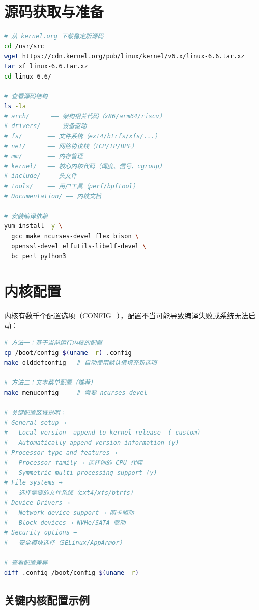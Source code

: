 \documentclass[12pt,UTF8]{ctexbook}
\begin{document}
\section{源码获取与准备}
\label{sec:kernel-source}

\begin{lstlisting}[language=bash]
# 从 kernel.org 下载稳定版源码
cd /usr/src
wget https://cdn.kernel.org/pub/linux/kernel/v6.x/linux-6.6.tar.xz
tar xf linux-6.6.tar.xz
cd linux-6.6/

# 查看源码结构
ls -la
# arch/      —— 架构相关代码（x86/arm64/riscv）
# drivers/   —— 设备驱动
# fs/       —— 文件系统（ext4/btrfs/xfs/...）
# net/      —— 网络协议栈（TCP/IP/BPF）
# mm/       —— 内存管理
# kernel/   —— 核心内核代码（调度、信号、cgroup）
# include/  —— 头文件
# tools/    —— 用户工具（perf/bpftool）
# Documentation/ —— 内核文档

# 安装编译依赖
yum install -y \
  gcc make ncurses-devel flex bison \
  openssl-devel elfutils-libelf-devel \
  bc perl python3
\end{lstlisting}

\section{内核配置}
\label{sec:kernel-config}

内核有数千个配置选项（CONFIG\_\*），配置不当可能导致编译失败或系统无法启动：

\begin{lstlisting}[language=bash]
# 方法一：基于当前运行内核的配置
cp /boot/config-$(uname -r) .config
make olddefconfig   # 自动使用默认值填充新选项

# 方法二：文本菜单配置（推荐）
make menuconfig     # 需要 ncurses-devel

# 关键配置区域说明：
# General setup →
#   Local version -append to kernel release  (-custom)
#   Automatically append version information (y)
# Processor type and features →
#   Processor family → 选择你的 CPU 代际
#   Symmetric multi-processing support (y)
# File systems →
#   选择需要的文件系统（ext4/xfs/btrfs）
# Device Drivers →
#   Network device support → 网卡驱动
#   Block devices → NVMe/SATA 驱动
# Security options →
#   安全模块选择（SELinux/AppArmor）

# 查看配置差异
diff .config /boot/config-$(uname -r)
\end{lstlisting}

\subsection*{关键内核配置示例}
\end{document}

